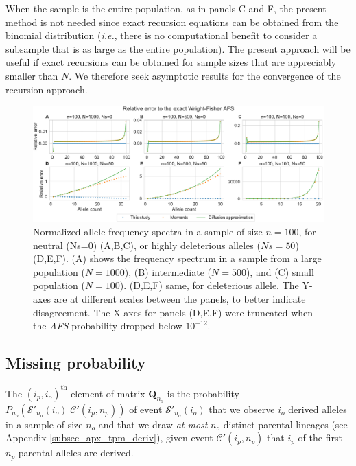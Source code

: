 \documentclass[review]{elsarticle}
\newcommand{\ms}{\mathcal{S}}
\begin{document}
When the sample is the entire population, as in panels C and F, the present method is not needed since
exact recursion equations can be obtained from the binomial distribution 
(\textit{i.e.}, there is no computational benefit to consider a subsample that is as large as the entire population). 
The present approach will be useful if exact recursions can be obtained for sample sizes that are appreciably smaller
than $N$. We therefore seek asymptotic results for the convergence of the recursion approach.

\begin{figure}
  \centering
  \includegraphics[width=0.7\textheight]{fig/strong_selection_six_panel.pdf}
  \caption{Normalized allele frequency spectra in a sample of size $n=100$, for neutral (Ns=0)
    (A,B,C), or highly deleterious alleles ($Ns=50$) (D,E,F). (A) shows the frequency spectrum in a
    sample from a large population ($N=1000$), (B) intermediate ($N=500$), and (C) small population
    ($N=100$). (D,E,F) same, for deleterious allele. The Y-axes are at different scales between the
    panels, to better indicate disagreement. The X-axes for panels (D,E,F) were truncated
    when the \textit{AFS} probability dropped below $10^{-12}$. }
  \label{fig_strong-selection}
\end{figure}

\subsection{Missing probability}
\label{subsec_missing}


The $(i_p,i_o)^\text{th}$ element of matrix $\mathbf{Q}_{n_o}$ is the probability
$P_{n_o}(\mathcal{S'}_{n_o} (i_o)| \mathcal{C'}(i_p,n_p))$ of event $\ms'_{n_o}(i_o)$ that we observe $i_o$ derived alleles in
a sample of size $n_o$ and that we draw \emph{at most} $n_o$ distinct parental lineages (see Appendix \ref{subsec_apx_tpm_deriv}), 
given event $\mathcal{C'}(i_p,n_p)$ that $i_p$ of the first $n_p$ parental alleles are derived.
\end{document}
